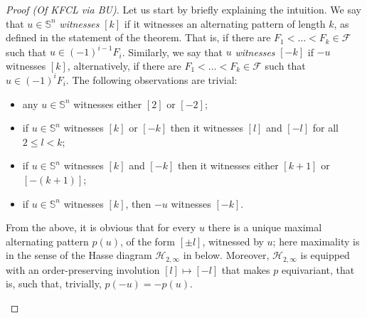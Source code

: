 \documentclass{article} %
\newcommand{\F}{\mathcal{F}}
\renewcommand{\H}{\mathcal{H}}
\renewcommand{\SS}{\mathbb{S}}
\begin{document}
\begin{proof}[Proof (Of KFCL via BU)]
	Let us start by briefly explaining the intuition. We say that $u\in \SS^n$ \emph{witnesses} $[k]$ if it witnesses an alternating pattern of length $k$, as defined in the statement of the theorem. That is, if there are $F_1 < \dots < F_{k} \in \F$ such that $u\in (-1)^{i-1}F_i$. Similarly, we say that $u$ \emph{witnesses} $[-k]$ if $-u$ witnesses $[k]$, alternatively, if there are $F_1 < \dots < F_{k} \in \F$ such that $u\in (-1)^{i}F_i$. The following observations are trivial: 
	\begin{itemize}
		\item any $u\in\SS^n$ witnesses either $[2]$ or $[-2]$;
		\item if $u\in\SS^n$ witnesses $[k]$ or $[-k]$ then it witnesses $[l]$ and $[-l]$ for all $2\leq l < k$;
		\item if $u\in\SS^n$ witnesses $[k]$ and $[-k]$ then it witnesses either $[k+1]$ or $[-(k+1)]$;
		\item if $u\in \SS^n$ witnesses $[k]$, then $-u$ witnesses $[-k]$.
	\end{itemize}
	From the above, it is obvious that for every $u$ there is a unique maximal alternating pattern $p(u)$, of the form  $[\pm l]$, witnessed by $u$; here maximality is in the sense of the Hasse diagram $\H_{2, \infty}$ in  below. Moreover, $\H_{2, \infty}$ is equipped with an order-preserving involution $[l] \mapsto [-l]$ that makes $p$ equivariant, that is, such that, trivially, $p(-u) = -p(u)$.
	
	\begin{figure}[hbt]
	    \centering
{}
\end{figure}
\end{proof}
\end{document}
